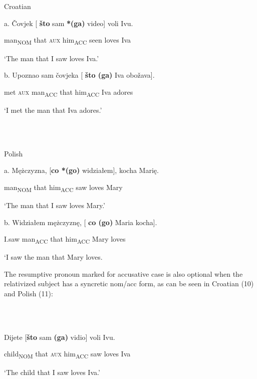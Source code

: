 \documentclass[output=paper]{langsci/langscibook}
\begin{document}
\ea%
    \label{ex:key:8}
    \gll\\
        \\
    \glt
    \z

          Croatian

a.   Čovjek   [  \textbf{što}   sam \textbf{*(ga)}   video]   voli   Ivu.

man\textsubscript{NOM}   that \textsc{aux}   him\textsubscript{ACC}   seen   loves   Iva

   ‘The man that I saw loves Iva.’

   b.   Upoznao   sam čovjeka [  \textbf{što (ga)}   Iva obožava].

    met   \textsc{aux} man\textsubscript{ACC}   that him\textsubscript{ACC} Iva adores

    ‘I met the man that Iva adores.’

\ea%
    \label{ex:key:9}
    \gll\\
        \\
    \glt
    \z

          Polish

a.   Mężczyzna, [\textbf{co *(go)}   widziałem],   kocha   Marię.

    man\textsubscript{NOM}   that him\textsubscript{ACC}   saw     loves   Mary

    ‘The man that I saw loves Mary.’

  b.   Widziałem   mężczyznę, [  \textbf{co (go)}   Maria   kocha]. 

    I.saw     man\textsubscript{ACC}   that him\textsubscript{ACC}   Mary   loves

    ‘I saw the man that Mary loves.

The resumptive pronoun marked for accusative case is also optional when the relativized subject has a syncretic nom/acc form, as can be seen in Croatian (10) and Polish (11): 

\ea%
    \label{ex:key:10}
    \gll\\
        \\
    \glt
    \z

          Dijete   [\textbf{što} sam \textbf{(ga)}   vidio]   voli   Ivu.

  child\textsubscript{NOM}   that \textsc{aux} him\textsubscript{ACC}   saw   loves   Iva

  ‘The child that I saw loves Iva.’

\ea%
    \label{ex:key:11}
    \gll\\
        \\
    \glt
    \z
\end{document}
